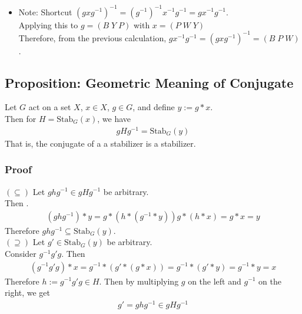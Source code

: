 \documentclass[11pt]{article}
\newcommand{\0}{\emptyset}
\begin{document}
\begin{itemize}
\item Note: Shortcut
\label{sec:orgfb914e4}
\((gxg^{-1})^{-1}=(g^{-1})^{-1}x^{-1}g^{-1}=gx^{-1}g^{-1}\).\\[0pt]
Applying this to \(g=(B\;Y\;P)\) with \(x=(P\;W\;Y)\)\\[0pt]
Therefore, from the previous calculation, \(gx^{-1}g^{-1}=(gxg^{-1})^{-1}=(B\;P\;W)\).\\[0pt]
\end{itemize}
\subsection*{Proposition: Geometric Meaning of Conjugate}
\label{sec:orgb02f5fb}
Let \(G\) act on a set \(X\), \(x\in X\), \(g\in G\), and define \(y:=g*x\).\\[0pt]
Then for \(H=\text{Stab}_{G}(x)\), we have\\[0pt]
\begin{align*}
  gHg^{-1}=\text{Stab}_{G}(y)
\end{align*}
That is, the conjugate of a a stabilizer is a stabilizer.\\[0pt]
\subsubsection*{Proof}
\label{sec:org90bf22c}
\((\subseteq)\) Let \(ghg^{-1}\in gHg^{-1}\) be arbitrary.\\[0pt]
Then .\\[0pt]
\begin{align*}
  (ghg^{-1})*y
  =g*(h*(g^{-1}*y))g*(h*x)
  =g*x
  =y
\end{align*}
Therefore \(ghg^{-1}\subseteq\text{Stab}_{G}(y)\).\\[0pt]
\((\supseteq)\) Let \(g'\in\text{Stab}_{G}(y)\) be arbitrary.\\[0pt]
Consider \(g^{-1}g'g\). Then\\[0pt]
\begin{align*}
  (g^{-1}g'g)*x
  =g^{-1}*(g'*(g*x))
  =g^{-1}*(g'*y)
  =g^{-1}*y
  =x
\end{align*}
Therefore \(h:=g^{-1}g'g\in H\). Then by multiplying \(g\) on the left and \(g^{-1}\) on the right, we get\\[0pt]
\begin{align*}
  g'=ghg^{-1}\in gHg^{-1}
\end{align*}
\end{document}
